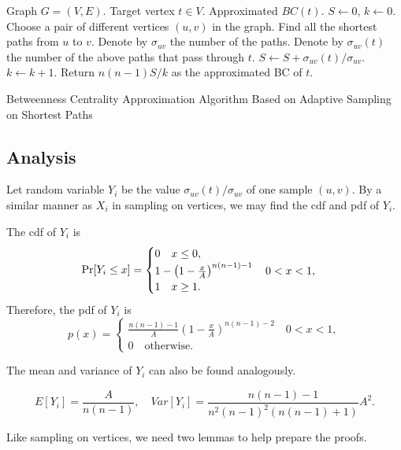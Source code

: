 \documentclass[10pt]{article}
\begin{document}
\begin{algorithm}
\centering
\begin{minipage}{0.95\textwidth}
\begin{algorithmic}
\Require Graph $G=(V, E)$. Target vertex $t\in V$.
\Ensure Approximated $BC(t)$.
\State $S \gets 0$, $k \gets 0$.
	\State Choose a pair of different vertices $(u, v)$ in the graph.
	\State Find all the shortest paths from $u$ to $v$. Denote by $\sigma_{uv}$ the number of the paths.
	\State Denote by $\sigma_{uv}(t)$ the number of the above paths that pass through $t$.
	\State $S \gets S + \sigma_{uv}(t)/\sigma_{uv}$.
	\State $k \gets k+1$.
\EndWhile
\State Return $n(n-1)S/k$ as the approximated BC of $t$.
\end{algorithmic}
\end{minipage}
\caption{Betweenness Centrality Approximation Algorithm Based on Adaptive Sampling on Shortest Paths}
\label{alg}
\end{algorithm}

\subsection{Analysis}
Let random variable $Y_i$ be the value $\sigma_{uv}(t)/\sigma_{uv}$ of one sample $(u, v)$. By a similar manner as $X_i$ in sampling on vertices, we may find the cdf and pdf of $Y_i$.

\begin{lemma}
\label{lem:df2}
The cdf of $Y_i$ is
$$\mathrm{Pr} [Y_i\leq x] = 
\begin{cases}
0 \quad x\leq 0, \\
1-\left( 1-\frac{x}{A} \right)^{n(n-1)-1}\quad 0<x<1,\\
1 \quad x\geq 1.
\end{cases}$$
Therefore, the pdf of $Y_i$ is
$$p(x) =
\begin{cases}
\frac{n(n-1)-1}{A} \left( 1-\frac{x}{A} \right)^{n(n-1)-2} \quad 0<x<1,\\
0 \quad \mathrm{otherwise}.
\end{cases}$$
\end{lemma}

The mean and variance of $Y_i$ can also be found analogously.
\begin{corollary}
\label{cor:ev2}
$$E[Y_i] = \frac{A}{n(n-1)}, \quad Var[Y_i] = \frac{n(n-1)-1}{n^2(n-1)^2(n(n-1)+1)}A^2.$$
\end{corollary}

Like sampling on vertices, we need two lemmas to help prepare the proofs.
\end{document}
